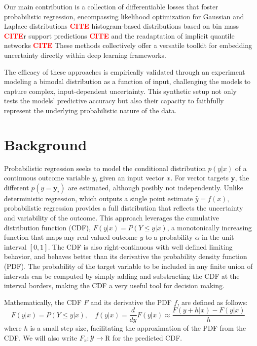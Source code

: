 \documentclass{article}
\newcommand{\citee}[1]{\textbf{\textcolor{red}{CITE}}}
\begin{document}
Our main contribution is a collection of differentiable losses that foster probabilistic regression, encompassing likelihood optimization for Gaussian and Laplace distributions \citee, histogram-based distributions based on bin mass \citee or support predictions \citee, and the readaptation of implicit quantile networks \citee. These methods collectively offer a versatile toolkit for embedding uncertainty directly within deep learning frameworks.

The efficacy of these approaches is empirically validated through an experiment modeling a bimodal distribution as a function of input, challenging the models to capture complex, input-dependent uncertainty. This synthetic setup not only tests the models' predictive accuracy but also their capacity to faithfully represent the underlying probabilistic nature of the data.





\section{Background}
Probabilistic regression seeks to model the conditional distribution $p(y|x)$ of a continuous outcome variable $y$, given an input vector $x$. For vector targets $\mathbf{y}$, the different $p(y=\mathbf{y}_i)$ are estimated, although posibly not independently. Unlike deterministic regression, which outputs a single point estimate $\hat{y} = f(x)$, probabilistic regression provides a full distribution that reflects the uncertainty and variability of the outcome. This approach leverages the cumulative distribution function (CDF), $F(y|x) = P(Y \leq y|x)$, a monotonically increasing function that maps any real-valued outcome $y$ to a probability $\alpha$ in the unit interval $[0, 1]$. The CDF is also right-continuous with well defined limiting behavior, and behaves better than its derivative the probability density function (PDF). The probability of the target variable to be included in any finite union of intervals can be computed by simply adding and substracting the CDF at the interval borders, making the CDF a very useful tool for decision making.

Mathematically, the CDF $F$ and its derivative the PDF $f$, are defined as follows:
\begin{equation}
    F(y|x) = P(Y \leq y|x), \quad f(y|x) = \frac{d}{dy}F(y|x) \approx \frac{F(y+h|x) - F(y|x)}{h}
\end{equation}
where $h$ is a small step size, facilitating the approximation of the PDF from the CDF. We will also write $F_x : \mathcal{Y} \to \mathrm{R}$ for the predicted CDF.
\end{document}
